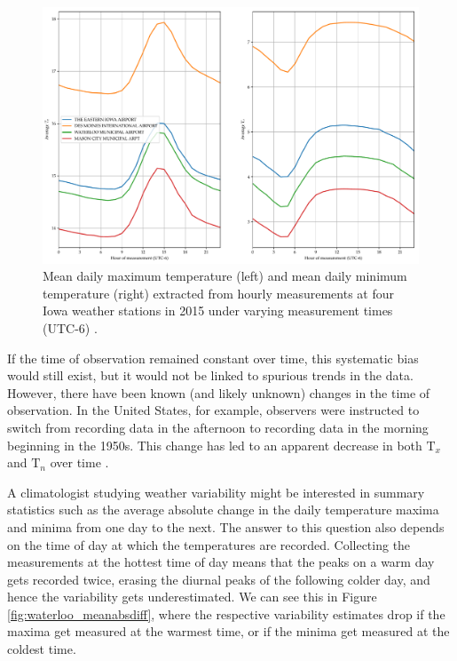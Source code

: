 \documentclass[letter]{article}
\makeatletter
\def\maxwidth{\ifdim\Gin@nat@width>\linewidth\linewidth
\else\Gin@nat@width\fi}
\let\Oldincludegraphics\includegraphics
\renewcommand{\includegraphics}[1]{\Oldincludegraphics[width=0.98\maxwidth]{#1}}
\newcommand{\T}{\mathrm{T}}
\newcommand{\Tn}{\T_{n}}
\newcommand{\Tx}{\T_{x}}
\makeatother
\begin{document}
\begin{figure}
\centering
\includegraphics{../figures/waterloo_avgTnTx.pdf}
\caption{\label{fig:waterloo_avgTnTx}
Mean daily maximum temperature (left)
and mean daily minimum temperature (right)
extracted from hourly measurements at four Iowa weather stations in 2015
under varying measurement times (UTC-6)
.}
\end{figure}
    



If the time of observation remained constant over time, this systematic bias would still exist, but it would not be linked to spurious trends in the data. However, there have been known (and likely unknown) changes in the time of observation.
In the United States, for example, observers were instructed to switch from recording data in the afternoon to recording data in the morning beginning in the 1950s.
This change has led to an apparent decrease in both $\Tx$ and $\Tn$ over time \citep{menne2009us}. 
    

        A climatologist studying weather variability might be interested in summary statistics such as the average absolute change in the daily temperature maxima and minima from one day to the next.
The answer to this question also depends on the time of day at which the temperatures are recorded.
Collecting the measurements at the hottest time of day means that the peaks on a warm day gets recorded twice,
erasing the diurnal peaks of the following colder day,
and hence the variability gets underestimated.
We can see this in Figure \ref{fig:waterloo_meanabsdiff}, where the respective variability estimates drop if the maxima get measured at the warmest time, or if the minima get measured at the coldest time.
\end{document}
